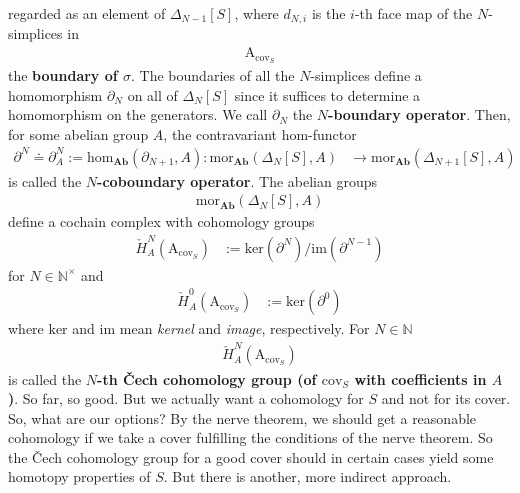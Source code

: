 regarded as an element of $\Delta_{N-1}[S]$, where $d_{N,i}$ is the $i$-th face map of the $N$-simplices in
\begin{align*}
  \mathrm{A}_{\mathrm{cov}_{S}}
\end{align*}
the \textbf{boundary of $\sigma$}.
The boundaries of all the $N$-simplices define a homomorphism $\partial_{N}$ on all of $\Delta_{N}[S]$ since it suffices to determine a homomorphism on the generators.
We call $\partial_{N}$ the \textbf{$N$-boundary operator}.
Then, for some abelian group $A$, the contravariant hom-functor
\begin{align*}
  \partial^{N}
  \doteq
  \partial_{A}^{N}
  :=
  \mathrm{hom}_{\mathbf{Ab}}(\partial_{N+1},A)
  \colon
  \mathrm{mor}_{\mathbf{Ab}}
  \left(
    \Delta_{N}[S],
    A
  \right)
  &\rightarrow
  \mathrm{mor}_{\mathbf{Ab}}
  \left(
    \Delta_{N+1}[S],
    A
  \right)
\end{align*}
is called the \textbf{$N$-coboundary operator}.
The abelian groups
\begin{align*}
  \mathrm{mor}_{\mathbf{Ab}}
  \left(
    \Delta_{N}[S],
    A
  \right)
\end{align*}
define a cochain complex with cohomology groups
\begin{align*}
  \check{H}_{A}^{N}
  \left(
    \mathrm{A}_{\mathrm{cov}_{S}}
  \right)
  &:=
  \mathrm{ker}
  \left(
    \partial^{N}
  \right)
  \slash
  \mathrm{im}
  \left(
    \partial^{N-1}
  \right)
\end{align*}
for $N \in \mathbb{N}^{\times}$ and
\begin{align*}
  \check{H}_{A}^{0}
  \left(
    \mathrm{A}_{\mathrm{cov}_{S}}
  \right)
  &:=
  \mathrm{ker}
  \left(
    \partial^{0}
  \right)
\end{align*}
where $\mathrm{ker}$ and $\mathrm{im}$ mean \textit{kernel} and \textit{image}, respectively.
For $N \in \mathbb{N}$ 
\begin{align*}
  \check{H}_{A}^{N}
  \left(
    \mathrm{A}_{\mathrm{cov}_{S}}
  \right)
\end{align*}
is called the \textbf{$N$-th \v{C}ech cohomology group (of $\mathrm{cov}_{S}$ with coefficients in $A$)}.
So far, so good.
But we actually want a cohomology for $S$ and not for its cover.
So, what are our options? By the nerve theorem, we should get a reasonable cohomology if we take a cover fulfilling the conditions of the nerve theorem.
So the \v{C}ech cohomology group for a good cover should in certain cases yield some homotopy properties of $S$.
But there is another, more indirect approach.
